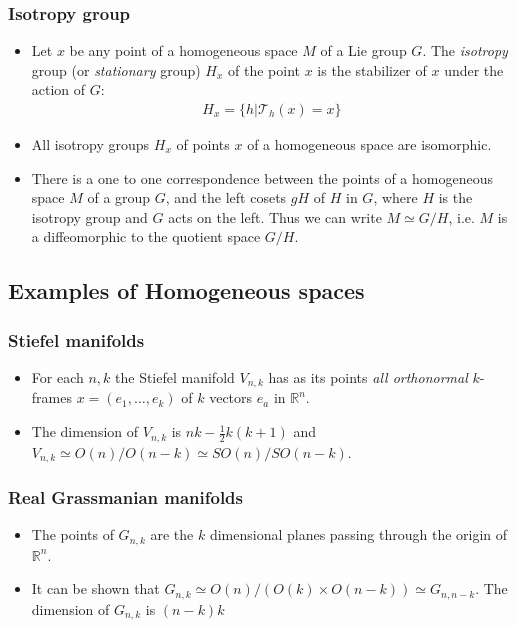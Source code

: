 \documentclass[11pt]{article}
\numberwithin{equation}{section}
\DeclareRobustCommand{\RR}{\mathbb{R}}
\begin{document}
\subsubsection{Isotropy group} %
\label{ssub:isotropy_group}
\begin{itemize}
  \item Let $x$ be any point of a homogeneous space $M$ of a Lie group $G$. The \emph{isotropy} group (or \emph{stationary} group) $H_{x}$ of the point $x$ is the stabilizer of $x$ under the action of $G$:
\begin{align*}
   H_x = \{ h | \mathcal{T}_{h}(x) = x\}
 \end{align*} 
 \item All isotropy groups $H_x$ of points $x$ of a homogeneous space are isomorphic. 

 \item There is a one to one correspondence between the points of a homogeneous space $M$ of a group $G$, and the left cosets $gH$ of $H$ in $G$, where $H$ is the isotropy group and $G$ acts on the left. Thus we can write $M \simeq G/H$, i.e. $M$ is a diffeomorphic to the quotient space $G/H$.    
\end{itemize}

\subsection{Examples of Homogeneous spaces} %
\label{sub:examples_of_homogeneous_spaces}
\subsubsection{Stiefel manifolds} %
\label{ssub:stiefel_manifolds}
\begin{itemize}
  \item For each $n,k$ the Stiefel manifold $V_{n,k}$ has as its points \emph{all orthonormal} $k$-frames $x=(e_1,\ldots,e_k)$ of $k$ vectors $e_{a}$ in $\RR^n$. 

  \item The dimension of $V_{n,k}$ is $nk-\frac{1}{2}k(k+1)$ and $V_{n,k} \simeq O(n)/O(n-k) \simeq SO(n)/SO(n-k)$.
\end{itemize}
\subsubsection{Real Grassmanian manifolds} %
\label{ssub:real_grassmanian_manifolds}
\begin{itemize}
  \item The points of $G_{n,k}$ are the $k$ dimensional planes passing through the origin of $\RR^{n}$. 

  \item It can be shown that $G_{n,k} \simeq O(n)/(O(k)\times O(n-k)) \simeq G_{n,n-k}$. The dimension of $G_{n,k}$ is $(n-k)k$ 
\end{itemize}
\end{document}

